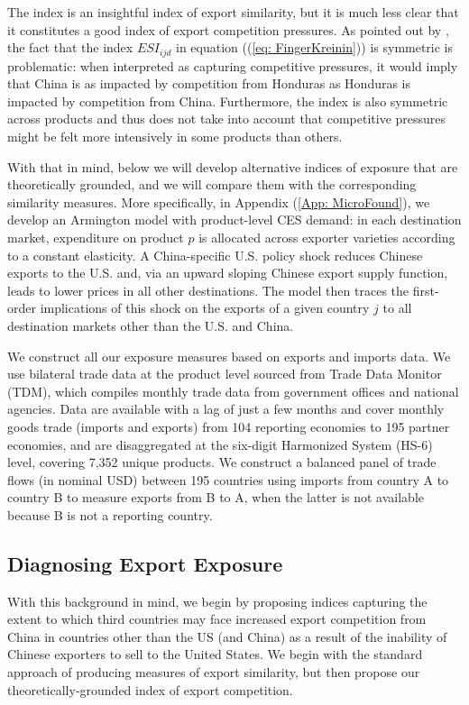 \documentclass[english,12pt]{article}
\theoremstyle{definition}
\let\oldref\ref
\renewcommand{\ref}[1]{(\oldref{#1})}
\begin{document}
The \cite{FingerKreinin1979ExportSimilarity} index is an insightful index of
export similarity, but it is much less clear that it constitutes a good
index of export competition pressures. As pointed out by \cite%
{jenkins2008measuring}, the fact that the index $ESI_{ijd}$ in equation (\ref%
{eq: FingerKreinin}) is symmetric is problematic: when interpreted as
capturing competitive pressures, it would imply that China is as impacted by
competition from Honduras as Honduras is impacted by competition from
China. Furthermore, the index is also symmetric across products and thus does not
take into account that competitive pressures might be felt more intensively
in some products than others.

With that in mind, below we will develop alternative indices of exposure
that are theoretically grounded, and we will compare them with the
corresponding similarity measures. More specifically, in Appendix \ref{App: MicroFound},
we develop an Armington model with product-level CES demand: in each
destination market, expenditure on product $p$ is allocated across exporter
varieties according to a constant elasticity. A China-specific U.S. policy
shock reduces Chinese exports to the U.S. and, via an upward sloping Chinese
export supply function, leads to lower prices in all other destinations. The
model then traces the first-order implications of this shock on the exports of a
given country $j$ to all destination markets other than the U.S. and China.

We construct all our exposure measures
based on exports and imports data. We use bilateral trade data at the product
level sourced from Trade Data Monitor (TDM), which compiles monthly trade
data from government offices and national agencies. Data are available with
a lag of just a few months and cover monthly goods trade (imports and
exports) from 104 reporting economies to 195 partner economies, and are
disaggregated at the six-digit Harmonized System (HS-6) level, covering
7,352 unique products. We construct a balanced panel of trade flows (in
nominal USD) between 195 countries using imports from country A to country B
to measure exports from B to A, when the latter is not available because B
is not a reporting country. 

\subsection{Diagnosing Export Exposure}

With this background in mind, we begin by proposing indices capturing the
extent to which third countries may face increased export competition from
China in countries other than the US (and China) as a result of the
inability of Chinese exporters to sell to the United States. We begin
with the standard approach of producing measures of export similarity,
but then propose our theoretically-grounded index of export competition.
\end{document}
